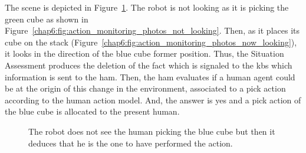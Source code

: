 \documentclass[a4paper,11pt,twoside]{StyleThese}
\begin{document}
The scene is depicted in Figure~\ref{chap6:fig:action_monitoring_photos_missing}. The robot is not looking as it is picking the green cube as shown in Figure~\ref{chap6:fig:action_monitoring_photos_not_looking}. Then, as it places its cube on the stack (Figure~\ref{chap6:fig:action_monitoring_photos_now_looking}), it looks in the direction of the blue cube former position. Thus, the Situation Assessment produces the deletion of the fact  which is signaled to the \acrshort{kb}s which information is sent to the \acrshort{ham}. Then, the \acrshort{ham} evaluates if a human agent could be at the origin of this change in the environment, associated to a pick action according to the human action model. And, the answer is yes and a pick action of the blue cube is allocated to the present human.
\thispagestyle{example}
\begin{figure}[!hbtp]
	\hfill
	\hfill
	\caption{The robot does not see the human picking the blue cube but then it deduces that he is the one to have performed the action.}
	\label{chap6:fig:action_monitoring_photos_missing}
\end{figure}
	
\end{document}
